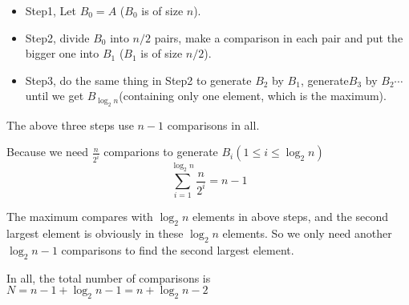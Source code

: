 \begin{itemize}
	\item Step1, Let $B_0 = A$ ($B_0$ is of size $n$).
	\item Step2, divide $B_0$ into $n/2$ pairs, make a comparison in each pair and put the bigger one into $B_1$ ($B_1$ is of size $n/2$).
	\item Step3, do the same thing in Step2 to generate $B_2$ by $B_1$, generate$B_3$ by $B_2 \cdots$ until we get $B_{\log_{2}n}$(containing only one element, which is the maximum).
\end{itemize}

\indent The above three steps use $n - 1$ comparisons in all.

Because we need $\displaystyle \frac{n}{2^i}$ comparions to generate $B_i (1\leq i \leq \log_{2}n)$
\[\sum_{i = 1} ^ {\log_{2}n} \frac{n}{2^i}= n - 1\]

The maximum compares with $\log_{2}n$ elements in above steps, and the second largest element is obviously in these $\log_{2}n$ elements. So we only need another $\log_{2}n - 1$ comparisons to find the second largest element.

In all, the total number of comparisons is $N = n- 1 + \log_{2}n - 1 = n + \log_{2}n - 2$
